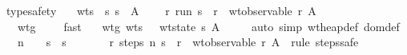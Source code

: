 \begin{isabellebody}
\endisadelimproof
\isanewline
{}\isamarkupfalse \ type{\isacharunderscore}safety{\isacharcolon}\isanewline
\ \ \ wts{\isacharcolon}\ {\isachardoublequoteopen}{\isacharbrackleft}{\isacharbrackright}\ {\isasymturnstile}\isactrlisub s\ s\ {\isacharcolon}\ A{\isachardoublequoteclose}\isanewline
\ \ \ {\isachardoublequoteopen}{\isasymexists}\ r{\isachardot}\ run\ s\ {\isacharequal}\ r\ {\isasymand}\ wt{\isacharunderscore}observable\ r\ A{\isachardoublequoteclose}\isanewline
\isadelimproof
\endisadelimproof
\isatagproof
{}\isamarkupfalse \ {\isacharminus}\isanewline
\ \ \isamarkupfalse \ wtg{\isacharcolon}\ {\isachardoublequoteopen}{\isacharbrackleft}{\isacharbrackright}{\isacharsemicolon}{\isacharbrackleft}{\isacharbrackright}\ {\isasymturnstile}\ {\isacharbrackleft}{\isacharbrackright}{\isachardoublequoteclose}\ \isamarkupfalse \ fast\isanewline
\ \ \isamarkupfalse \ wtg\ wts\ \isamarkupfalse \ {}{\isacharcolon}\ {\isachardoublequoteopen}wt{\isacharunderscore}state\ {\isacharparenleft}s{\isacharcomma}{\isacharbrackleft}{\isacharbrackright}{\isacharcomma}{\isacharbrackleft}{\isacharbrackright}{\isacharcomma}{\isacharbrackleft}{\isacharbrackright}{\isacharcomma}{\isacharbrackleft}{\isacharbrackright}{\isacharparenright}\ A{\isachardoublequoteclose}\isanewline
\ \ \ \ \isamarkupfalse \ {\isacharparenleft}auto\ simp{\isacharcolon}\ wt{\isacharunderscore}heap{\isacharunderscore}def\ dom{\isacharunderscore}def{\isacharparenright}\isanewline
\ \ \isamarkupfalse \ {\isacharquery}n\ {\isacharequal}\ {\isachardoublequoteopen}{}{}{}{}{}{}{}{\isachardoublequoteclose}\ \ {\isacharquery}s\ {\isacharequal}\ {\isachardoublequoteopen}{\isacharparenleft}s{\isacharcomma}{\isacharbrackleft}{\isacharbrackright}{\isacharcomma}{\isacharbrackleft}{\isacharbrackright}{\isacharcomma}{\isacharbrackleft}{\isacharbrackright}{\isacharcomma}{\isacharbrackleft}{\isacharbrackright}{\isacharparenright}{\isachardoublequoteclose}\isanewline
\ \ \isamarkupfalse \ {}\ \isamarkupfalse \ {}{\isacharcolon}\ {\isachardoublequoteopen}{\isasymexists}\ r{\isachardot}\ steps\ {\isacharquery}n\ {\isacharquery}s\ {\isacharequal}\ r\ {\isasymand}\ wt{\isacharunderscore}observable\ r\ A{\isachardoublequoteclose}\ \isamarkupfalse \ {\isacharparenleft}rule\ steps{\isacharunderscore}safe{\isacharparenright}\isanewline

\end{isabellebody}
